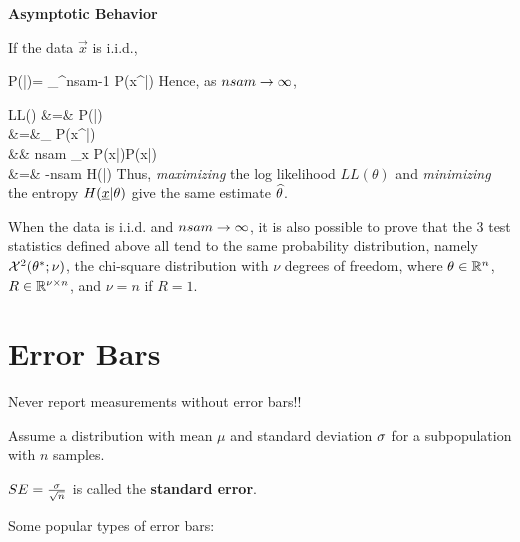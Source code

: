 {\bf Asymptotic Behavior}

If the data
$\vec{x}$ is i.i.d.,

\beq
P(|\theta)=
\prod_{}^{nsam-1} P(x^\s|\theta)
\;
\eeq
Hence, as $nsam\rightarrow \infty$,

\beqa
LL(\theta)
&=&
\ln P(|\theta)
\\
&=&\sum_\s \ln
P(x^\s|\theta)
\\
&\rarrow&
nsam \sum_x P(x|\theta)\ln  P(x|\theta)
\\
&=&
-nsam \; H(\rvx|\theta)
\eeqa
Thus, {\it maximizing} the log likelihood
$LL(\theta)$
and {\it minimizing} the entropy
$H(\rvx|\theta)$
give the same estimate ${\widehat{\theta}}$.

When the
data is i.i.d. and
$nsam\rightarrow \infty$,
it is also possible to
prove that
the 3 test statistics
defined above all tend to
the same
probability  distribution, namely
${\cal X}^2(\theta^*; \nu)$,
the chi-square distribution
with $\nu$ degrees of freedom,
where $\theta\in { \mathbb{R}}^n$, $R\in { \mathbb{R}}^
{\nu\times n}$, and $\nu=n$ if $R=1$.

\section{Error Bars}
Never report measurements without error bars!!

Assume a distribution
with mean $\mu$ and
standard deviation $\sigma$
for a subpopulation with $n$
samples.

$SE=\frac{\sigma}{\sqrt{n}}$
is called the {\bf standard error}.


Some popular types of error bars:


